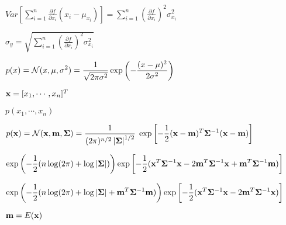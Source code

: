 \documentclass{article}
\def\lthtmlcheckvsize{\ifdim\ht\sizebox<\vsize 
  \ifdim\wd\sizebox<\hsize\expandafter\hfill\fi \expandafter\vfill
  \else\expandafter\vss\fi}%
\begin{document}
{\newpage\clearpage
{}%
$\displaystyle Var\left[ \sum_{i=1}^n \frac{\partial f}{\partial x_i} (x_i-\mu_{x_i}) \right]
=\sum_{i=1}^n \left(\frac{\partial f}{\partial x_i}\right)^2 \sigma_{x_i}^2$%
\lthtmlindisplaymathZ
\lthtmlcheckvsize\clearpage}

{\newpage\clearpage
{}%
$\displaystyle \sigma_y=\sqrt{\sum_{i=1}^n \left(\frac{\partial f}{\partial x_i}\right)^2 \sigma_{x_i}^2 }$%
\lthtmlindisplaymathZ
\lthtmlcheckvsize\clearpage}

{\newpage\clearpage
{}%
$\displaystyle p(x)={\cal N}(x,\mu,\sigma^2)
=\frac{1}{\sqrt{2\pi\sigma^2}}\exp\left(-\frac{(x-\mu)^2}{2\sigma^2}\right)$%
\lthtmlindisplaymathZ
\lthtmlcheckvsize\clearpage}

{\newpage\clearpage
{}%
$ {\bf x}=[x_1,\cdots, x_n]^T$%
\lthtmlindisplaymathZ
\lthtmlcheckvsize\clearpage}

{\newpage\clearpage
{}%
$\displaystyle p(x_1,\cdots, x_n)$%
\lthtmlindisplaymathZ
\lthtmlcheckvsize\clearpage}

{\newpage\clearpage
{}%
$\displaystyle p({\bf x})={\cal N}({\bf x},{\bf m},{\bf\Sigma})
=\frac{1}{(2\pi)^{n/2} \left| {\bf\Sigma} \right|^{1/2}}\;
\exp\left[ -\frac{1}{2}({\bf x}-{\bf m})^T
{\bf\Sigma}^{-1}({\bf x}-{\bf m})\right]$%
\lthtmlindisplaymathZ
\lthtmlcheckvsize\clearpage}

{\newpage\clearpage
{}%
$\displaystyle \exp\left(-\frac{1}{2}(n\log(2\pi) + \log|{\bf\Sigma}|)\right)
\exp\left[ -\frac{1}{2}({\bf x}^T{\bf\Sigma}^{-1}{\bf x}
-2{\bf m}^T{\bf\Sigma}^{-1}{\bf x}+{\bf m}^T{\bf\Sigma}^{-1}{\bf m})\right]$%
\lthtmlindisplaymathZ
\lthtmlcheckvsize\clearpage}

{\newpage\clearpage
{}%
$\displaystyle \exp\left(-\frac{1}{2} ( n\log(2\pi) + \log|{\bf\Sigma}|
+{\bf m}^T{\bf\Sigma}^{-1}{\bf m} ) \right)
\exp\left[ -\frac{1}{2}({\bf x}^T{\bf\Sigma}^{-1}{\bf x}
-2{\bf m}^T{\bf\Sigma}^{-1}{\bf x})\right]$%
\lthtmlindisplaymathZ
\lthtmlcheckvsize\clearpage}

{\newpage\clearpage
{}%
$ {\bf m}=E({\bf x})$%
\lthtmlindisplaymathZ
\lthtmlcheckvsize\clearpage}
\end{document}
